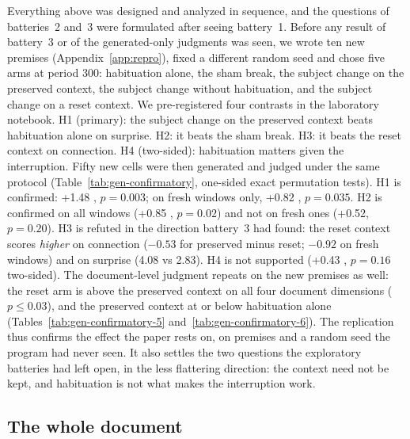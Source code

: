 Everything above was designed and analyzed in sequence, and the questions of
batteries~2 and~3 were formulated after seeing battery~1. Before any result
of battery~3 or of the generated-only judgments was seen, we wrote ten new
premises (Appendix~\ref{app:repro}), fixed a different random seed and
chose five arms at period 300: habituation alone, the sham break, the
subject change on the preserved context, the subject change without
habituation, and the subject change on a reset context. We pre-registered
four contrasts in the laboratory notebook. H1 (primary): the subject change
on the preserved context beats habituation alone on surprise. H2: it beats
the sham break. H3: it beats the reset context on connection. H4
(two-sided): habituation matters given the interruption. Fifty new cells
were then generated and judged under the same protocol
(Table~\ref{tab:gen-confirmatory}, one-sided exact permutation tests). H1 is
confirmed: +1.48 , $p=0.003$; on fresh windows only, +0.82
, $p=0.035$. H2 is confirmed on all windows (+0.85
, $p=0.02$) and not on fresh ones (+0.52, $p=0.20$). H3 is
refuted in the direction battery~3 had found: the reset context scores
\emph{higher} on connection ($-0.53$  for preserved minus
reset; $-0.92$ on fresh windows) and on surprise (4.08 vs 2.83). H4 is not
supported (+0.43 , $p=0.16$ two-sided). The document-level
judgment repeats on the new premises as well: the reset arm is above the
preserved context on all four document dimensions ($p\le0.03$), and the
preserved context at or below habituation alone
(Tables~\ref{tab:gen-confirmatory-5} and~\ref{tab:gen-confirmatory-6}). The
replication thus confirms the
effect the paper rests on, on premises and a random seed the program had
never seen. It also settles the two questions the exploratory batteries had
left open, in the less flattering direction: the context need not be kept,
and habituation is not what makes the interruption work.

\subsection{The whole document}
\label{sec:document}

